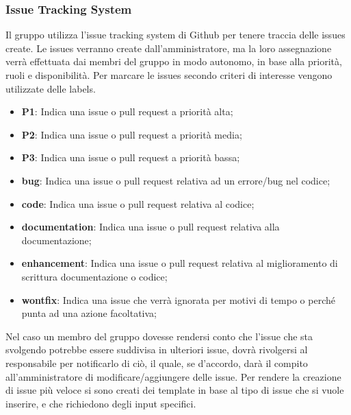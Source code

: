         \subsubsection{Issue Tracking System}\label{inf:its}
        Il gruppo utilizza l'issue tracking system di Github per tenere traccia delle issues create. Le issues verranno
        create dall'amministratore, ma la loro assegnazione verrà effettuata dai membri del gruppo in modo autonomo, in base
        alla priorità, ruoli e disponibilità.
        Per marcare le issues secondo criteri di interesse vengono utilizzate delle labels.
        \begin{itemize}
            \item \textbf{P1}: Indica una issue o pull request a priorità alta;
            \item \textbf{P2}: Indica una issue o pull request a priorità media;
            \item \textbf{P3}: Indica una issue o pull request a priorità bassa;
            \item \textbf{bug}: Indica una issue o pull request relativa ad un errore/bug nel codice;
            \item \textbf{code}: Indica una issue o pull request relativa al codice;
            \item \textbf{documentation}: Indica una issue o pull request relativa alla documentazione;
            \item \textbf{enhancement}: Indica una issue o pull request relativa al miglioramento di scrittura documentazione o codice;
            \item \textbf{wontfix}: Indica una issue che verrà ignorata per motivi di tempo o perché punta ad una azione facoltativa;
        \end{itemize}
        Nel caso un membro del gruppo dovesse rendersi conto che l'issue che sta svolgendo potrebbe essere
        suddivisa in ulteriori issue, dovrà rivolgersi al responsabile per notificarlo di ciò, il quale, se d'accordo,
        darà il compito all'amministratore di modificare/aggiungere delle issue.
        Per rendere la creazione di issue più veloce si sono creati dei template in base al tipo di issue che si vuole inserire, e che richiedono degli input
        specifici.
